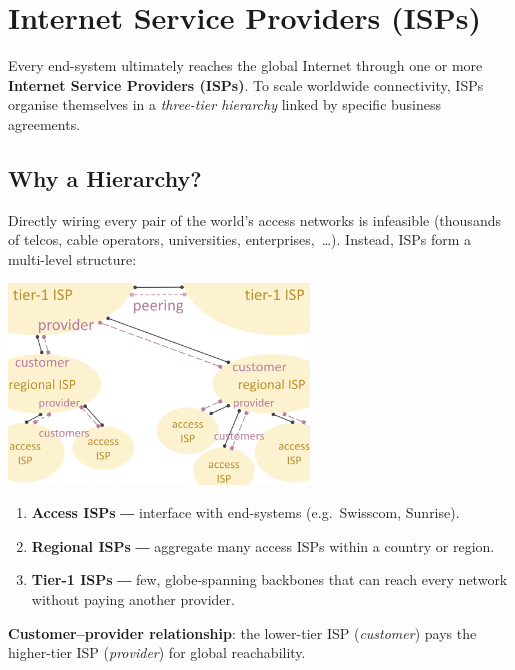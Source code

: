 \documentclass[../../compsys.tex]{subfiles}
\begin{document}
\section{Internet Service Providers (ISPs)}\label{sec:isps}
Every end-system ultimately reaches the global Internet through one or
more \textbf{Internet Service Providers (ISPs)}.  
To scale worldwide connectivity, ISPs organise themselves in a \emph{three-tier
hierarchy} linked by specific business agreements.

\subsection{Why a Hierarchy?}\label{subsec:whyhier}
Directly wiring every pair of the world's access networks is infeasible
(thousands of telcos, cable operators, universities, enterprises,~\dots).
Instead, ISPs form a multi-level structure:
\begin{center}
    \includegraphics[width=0.60\textwidth]{images/isp-hiearchy.png}
  \end{center}
  
\begin{enumerate}
  \item \textbf{Access ISPs} ― interface with end-systems (e.g.\ Swisscom,
        Sunrise).
  \item \textbf{Regional ISPs} ― aggregate many access ISPs within a
        country or region.
  \item \textbf{Tier-1 ISPs} ― few, globe-spanning backbones that can
        reach every network without paying another provider.
\end{enumerate}

\begin{definition}
  \textbf{Customer–provider relationship}: the lower-tier ISP
  (\emph{customer}) pays the higher-tier ISP (\emph{provider}) for global
  reachability.
\end{definition}
\end{document}
